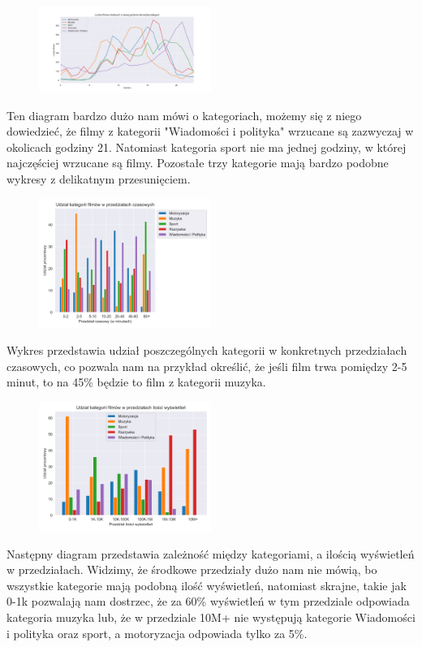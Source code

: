 \begin{figure}[H]
    \centering
    \includegraphics[width=0.5\textwidth]{Images/Zależność_dodania_do_filmu_a_kategorią.png}
    \label{fig:add_film_hour}
\end{figure}
Ten diagram bardzo dużo nam mówi o kategoriach, możemy się z niego dowiedzieć, że filmy z kategorii "Wiadomości i polityka" wrzucane są zazwyczaj w okolicach godziny 21. Natomiast kategoria sport nie ma jednej godziny, w której najczęściej wrzucane są filmy. Pozostałe trzy kategorie mają bardzo podobne wykresy z delikatnym przesunięciem.

\begin{figure}[H]
    \centering
    \includegraphics[width=0.5\textwidth]{Images/Udział kategorii filmów w przedziałach czasowych.png}
    \label{fig:durations}
\end{figure}
Wykres przedstawia udział poszczególnych kategorii w konkretnych przedziałach czasowych, co pozwala nam na przykład określić, że jeśli film trwa pomiędzy 2-5 minut, to na 45\% będzie to film z kategorii muzyka.


\begin{figure}[H]
    \centering
    \includegraphics[width=0.5\textwidth]{Images/Zależność wyświetleń od kategorią.png}
    \label{fig:views_count}
\end{figure}
Następny diagram przedstawia zależność między kategoriami, a ilością wyświetleń w przedziałach. Widzimy, że środkowe przedziały dużo nam nie mówią, bo wszystkie kategorie mają podobną ilość wyświetleń, natomiast skrajne, takie jak 0-1k pozwalają nam dostrzec, że za 60\% wyświetleń w tym przedziale odpowiada kategoria muzyka lub, że w przedziale 10M+ nie występują kategorie Wiadomości i polityka oraz sport, a motoryzacja odpowiada tylko za 5\%.

